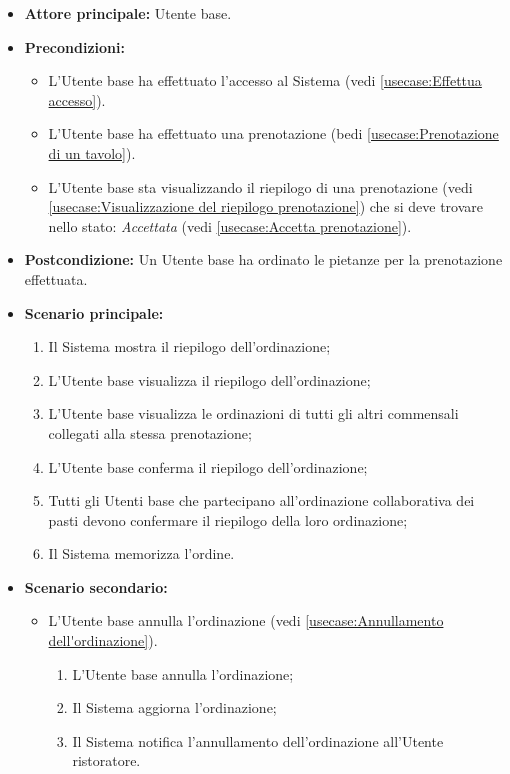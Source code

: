 \label{usecase:Creazione dell'ordinazione collaborativa dei pasti}
\begin{itemize}
	\item \textbf{Attore principale:} Utente base.

	\item \textbf{Precondizioni:}
		\begin{itemize}
			\item L'Utente base ha effettuato l'accesso al Sistema (vedi \autoref{usecase:Effettua accesso}).
			\item L'Utente base ha effettuato una prenotazione (bedi \autoref{usecase:Prenotazione di un tavolo}).
			\item L'Utente base sta visualizzando il riepilogo di una prenotazione (vedi \autoref{usecase:Visualizzazione del riepilogo prenotazione}) che si deve trovare nello stato: \textit{Accettata}  (vedi \autoref{usecase:Accetta prenotazione}).
		\end{itemize}
	      
	\item \textbf{Postcondizione:} Un Utente base ha ordinato le pietanze per la prenotazione effettuata.

	\item \textbf{Scenario principale:}
	      \begin{enumerate}
		      \item Il Sistema mostra il riepilogo dell'ordinazione;
		      \item L'Utente base visualizza il riepilogo dell'ordinazione;
		      \item L'Utente base visualizza le ordinazioni di tutti gli altri commensali collegati alla stessa prenotazione;
		      \item L'Utente base conferma il riepilogo dell'ordinazione;
		      \item Tutti gli Utenti base che partecipano all'ordinazione collaborativa dei pasti devono
			   confermare il riepilogo della loro ordinazione;
			   \item Il Sistema memorizza l'ordine.
	      \end{enumerate}

	\item \textbf{Scenario secondario:}
	      \begin{itemize}
		      \item L'Utente base annulla l'ordinazione (vedi
		            \autoref{usecase:Annullamento dell'ordinazione}).
		            \begin{enumerate}
			            \item L'Utente base annulla l'ordinazione;
			            \item Il Sistema aggiorna l'ordinazione;
			            \item Il Sistema notifica l'annullamento dell'ordinazione
			                  all'Utente ristoratore.
		            \end{enumerate}
	      \end{itemize}
\end{itemize}


